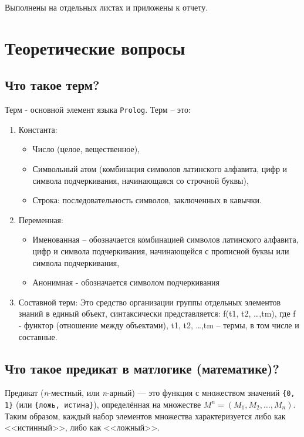Выполнены на отдельных листах и приложены к отчету.

\section{Теоретические вопросы}

\subsection{Что такое терм?}

Терм - основной элемент языка \texttt{Prolog}. Терм – это:
\begin{enumerate}
	\item Константа: 
	\begin{itemize}
		\item Число (целое, вещественное),
		\item Символьный атом (комбинация символов латинского алфавита, цифр и символа подчеркивания, начинающаяся со строчной буквы),
		\item Строка: последовательность символов, заключенных в кавычки.
	\end{itemize}
	\item Переменная:
	\begin{itemize}
		\item Именованная – обозначается комбинацией символов латинского алфавита, цифр и символа подчеркивания, начинающейся с прописной буквы или символа подчеркивания,
		\item Анонимная  - обозначается символом подчеркивания
	\end{itemize}
	\item Составной терм:
	Это средство организации группы отдельных элементов знаний в единый  объект,  синтаксически представляется: f(t1, t2, …,tm), где f -  функтор (отношение между объектами), t1, t2, …,tm – термы, в том  числе  и составные.
\end{enumerate}

\subsection{Что такое предикат в матлогике (математике)?}

Предикат (\textit{n}-местный, или \textit{n}-арный) --- это функция с множеством значений \texttt{\{0, 1\}} (или \texttt{\{ложь, истина\}}), определённая на множестве $M^n = (M_1, M_2, \ldots, M_n)$. Таким образом, каждый набор элементов множества характеризуется либо как <<истинный>>, либо как <<ложный>>.

